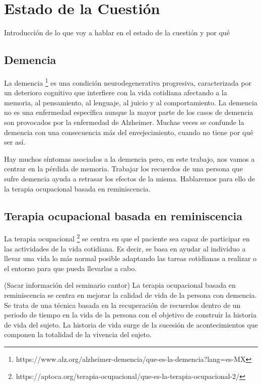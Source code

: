 \chapter{Estado de la Cuestión}
\label{cap:estadoDeLaCuestion}

Introducción de lo que voy a hablar en el estado de la cuestión y por qué

\section{Demencia}
La demencia \footnote{https://www.alz.org/alzheimer-demencia/que-es-la-demencia?lang=es-MX} es una condición neurodegenerativa progresiva, caracterizada por un deterioro cognitivo que interfiere con la vida cotidiana afectando a la memoria, al pensamiento, al lenguaje, al juicio y al comportamiento. La demencia no es una enfermedad específica aunque la mayor parte de los casos de demencia son provocados por la enfermedad de Alzheimer. Muchas veces se confunde la demencia con una consecuencia más del envejecimiento, cuando no tiene por qué ser así.

Hay muchos síntomas asociados a la demencia pero, en este trabajo, nos vamos a centrar en la pérdida de memoria. Trabajar los recuerdos de una persona que sufre demencia ayuda a retrasar los efectos de la misma. Hablaremos para ello de la terapia ocupacional basada en reminiscencia.

\section{Terapia ocupacional basada en reminiscencia}
La terapia ocupacional \footnote{https://aptoca.org/terapia-ocupacional/que-es-la-terapia-ocupacional-2/} se centra en que el paciente sea capaz de participar en las actividades de la vida cotidiana. Es decir, se basa en ayudar al individuo a llevar una vida lo más normal posible adaptando las tareas cotidianas a realizar o el entorno para que pueda llevarlas a cabo.

(Sacar información del seminario cantor)
La terapia ocupacional basada en reminiscencia se centra en mejorar la calidad de vida de la persona con demencia. Se trata de una técnica basada en la recuperación de recuerdos dentro de un periodo de tiempo en la vida de la persona con el objetivo de construir la historia de vida del sujeto. La historia de vida surge de la sucesión de acontecimientos que componen la totalidad de la vivencia del sujeto.


